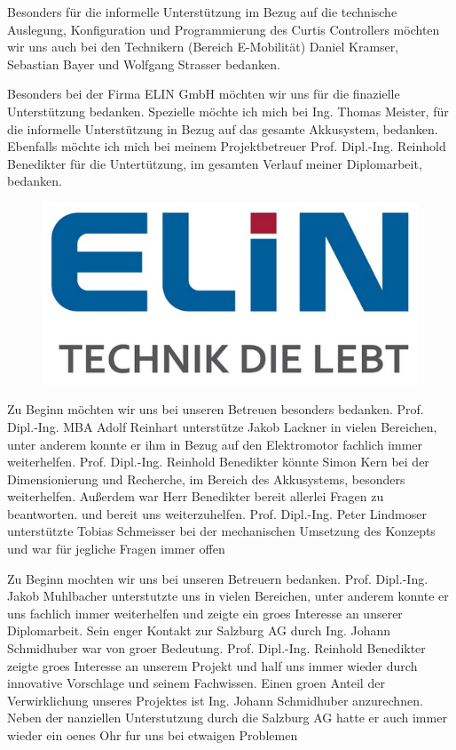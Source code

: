 \begin{center}
	
Besonders für die informelle Unterstützung im Bezug auf die technische Auslegung, Konfiguration und Programmierung des Curtis Controllers möchten wir uns auch bei den Technikern (Bereich E-Mobilität) Daniel Kramser, Sebastian Bayer und Wolfgang Strasser bedanken.
\vspace{1cm}

Besonders bei der Firma ELIN GmbH möchten wir uns für die finazielle Unterstützung bedanken. Spezielle möchte ich mich bei Ing. Thomas Meister, für die informelle Unterstützung in Bezug auf das gesamte Akkusystem, bedanken.
Ebenfalls möchte ich mich bei meinem Projektbetreuer Prof. Dipl.-Ing. Reinhold Benedikter für die Untertützung, im gesamten Verlauf meiner Diplomarbeit, bedanken.

\begin{figure}[H]
	\begin{center}
		\includegraphics[scale=0.7]{figures/allgemein/Elin Logo.png}
	\end{center}
\end{figure}
\vspace{1cm}

Zu Beginn möchten wir uns bei unseren Betreuen besonders bedanken. Prof. Dipl.-Ing. MBA Adolf Reinhart unterstütze Jakob Lackner in vielen Bereichen, unter anderem konnte er ihm in Bezug auf den Elektromotor fachlich immer weiterhelfen. Prof. Dipl.-Ing. Reinhold Benedikter könnte Simon Kern bei der Dimensionierung und Recherche, im Bereich des Akkusystems, besonders weiterhelfen. Außerdem war Herr Benedikter bereit allerlei Fragen zu beantworten. und bereit uns weiterzuhelfen. Prof. Dipl.-Ing. Peter Lindmoser unterstützte Tobias Schmeisser bei der mechanischen Umsetzung des Konzepts und war für jegliche Fragen immer offen

Zu Beginn mochten wir uns bei unseren Betreuern bedanken. Prof. Dipl.-Ing. Jakob Muhlbacher
unterstutzte uns in vielen Bereichen, unter anderem konnte er uns fachlich immer weiterhelfen
und zeigte ein groes Interesse an unserer Diplomarbeit. Sein enger Kontakt zur Salzburg AG
durch Ing. Johann Schmidhuber war von groer Bedeutung.
Prof. Dipl.-Ing. Reinhold Benedikter zeigte groes Interesse an unserem Projekt und half uns
immer wieder durch innovative Vorschlage und seinem Fachwissen.
Einen groen Anteil der Verwirklichung unseres Projektes ist Ing. Johann Schmidhuber anzurechnen. Neben der nanziellen Unterstutzung durch die Salzburg AG hatte er auch immer wieder
ein oenes Ohr fur uns bei etwaigen Problemen


\end{center}
